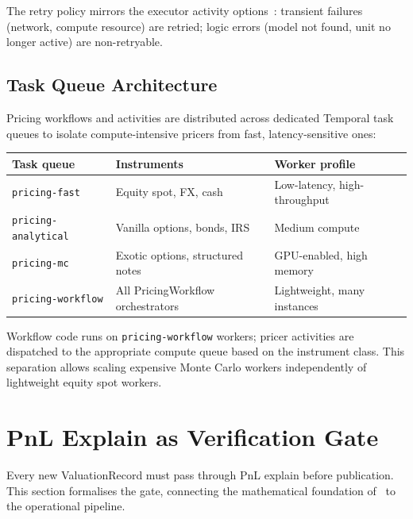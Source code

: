 \documentclass[11pt,a4paper]{article}
\begin{document}
\noindent The retry policy mirrors the executor activity options~\cite[\S14.2]{ledger}: transient failures (network, compute resource) are retried; logic errors (model not found, unit no longer active) are non-retryable.

\subsection{Task Queue Architecture}

Pricing workflows and activities are distributed across dedicated Temporal task queues to isolate compute-intensive pricers from fast, latency-sensitive ones:

\begin{center}
\small
\begin{tabular}{l l l}
\toprule
\textbf{Task queue} & \textbf{Instruments} & \textbf{Worker profile} \\
\midrule
\texttt{pricing-fast} & Equity spot, FX, cash & Low-latency, high-throughput \\
\texttt{pricing-analytical} & Vanilla options, bonds, IRS & Medium compute \\
\texttt{pricing-mc} & Exotic options, structured notes & GPU-enabled, high memory \\
\texttt{pricing-workflow} & All PricingWorkflow orchestrators & Lightweight, many instances \\
\bottomrule
\end{tabular}
\end{center}

\noindent Workflow code runs on \texttt{pricing-workflow} workers; pricer activities are dispatched to the appropriate compute queue based on the instrument class.  This separation allows scaling expensive Monte Carlo workers independently of lightweight equity spot workers.

\clearpage
\section{PnL Explain as Verification Gate}
\label{sec:pnl-explain}

Every new ValuationRecord must pass through PnL explain before publication.  This section formalises the gate, connecting the mathematical foundation of~\cite{pnl_explain} to the operational pipeline.
\end{document}
